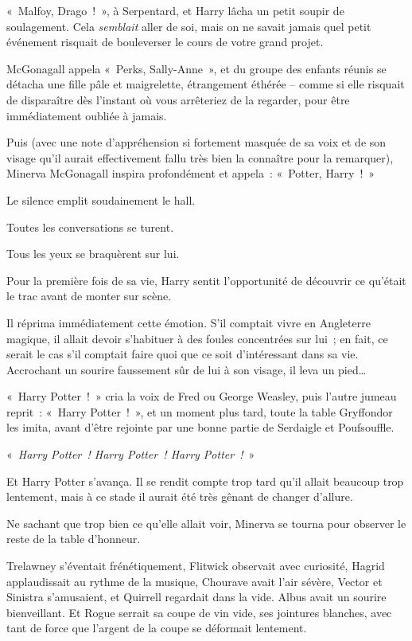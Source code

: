 «~Malfoy, Drago~!~», à Serpentard, et Harry lâcha un petit soupir de soulagement.
Cela \emph{semblait} aller de soi, mais on ne savait jamais quel petit événement risquait de bouleverser le cours de votre grand projet.

McGonagall appela «~Perks, Sally-Anne~», et du groupe des enfants réunis se détacha une fille pâle et maigrelette, étrangement éthérée -- comme si elle risquait de disparaître dès l'instant où vous arrêteriez de la regarder, pour être immédiatement oubliée à jamais.

Puis (avec une note d'appréhension si fortement masquée de sa voix et de son visage qu'il aurait effectivement fallu très bien la connaître pour la remarquer), Minerva McGonagall inspira profondément et appela~: «~Potter, Harry~!~»

Le silence emplit soudainement le hall.

Toutes les conversations se turent.

Tous les yeux se braquèrent sur lui.

Pour la première fois de sa vie, Harry sentit l'opportunité de découvrir ce qu'était le trac avant de monter sur scène.

Il réprima immédiatement cette émotion.
S'il comptait vivre en Angleterre magique, il allait devoir s'habituer à des foules concentrées sur lui~; en fait, ce serait le cas s'il comptait faire quoi que ce soit d'intéressant dans sa vie. Accrochant un sourire faussement sûr de lui à son visage, il leva un pied…

«~Harry Potter~!~» cria la voix de Fred ou George Weasley, puis l'autre jumeau reprit~: «~Harry Potter~!~», et un moment plus tard, toute la table Gryffondor les imita, avant d'être rejointe par une bonne partie de Serdaigle et Poufsouffle.

«~\emph{Harry Potter~! Harry Potter~! Harry Potter~!}~»

Et Harry Potter s'avança. Il se rendit compte trop tard qu'il allait beaucoup trop lentement, mais à ce stade il aurait été très gênant de changer d'allure.

\later

Ne sachant que trop bien ce qu'elle allait voir, Minerva se tourna pour observer le reste de la table d'honneur.

Trelawney s'éventait frénétiquement, Flitwick observait avec curiosité, Hagrid applaudissait au rythme de la musique, Chourave avait l'air sévère, Vector et Sinistra s'amusaient, et Quirrell regardait dans la vide. Albus avait un sourire bienveillant. Et Rogue serrait sa coupe de vin vide, ses jointures blanches, avec tant de force que l'argent de la coupe se déformait lentement.

